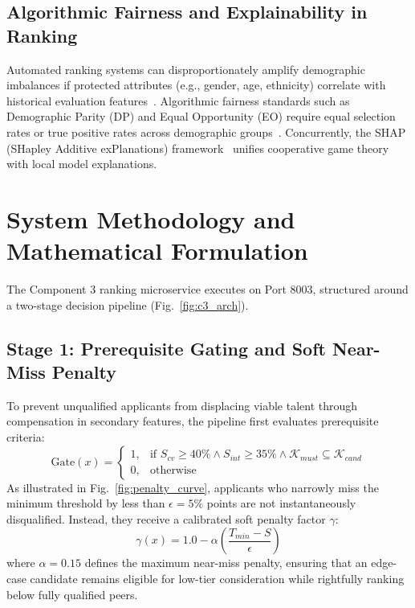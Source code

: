 \documentclass[conference]{IEEEtran}
\begin{document}
\subsection{Algorithmic Fairness and Explainability in Ranking}
Automated ranking systems can disproportionately amplify demographic imbalances if protected attributes (e.g., gender, age, ethnicity) correlate with historical evaluation features~\cite{singh2018fairness}. Algorithmic fairness standards such as Demographic Parity (DP) and Equal Opportunity (EO) require equal selection rates or true positive rates across demographic groups~\cite{hardt2016equality, zehlike2017fair}. Concurrently, the SHAP (SHapley Additive exPlanations) framework~\cite{lundberg2017unified} unifies cooperative game theory with local model explanations.

\section{System Methodology and Mathematical Formulation}
The Component 3 ranking microservice executes on Port 8003, structured around a two-stage decision pipeline (Fig.~\ref{fig:c3_arch}).

\subsection{Stage 1: Prerequisite Gating and Soft Near-Miss Penalty}
To prevent unqualified applicants from displacing viable talent through compensation in secondary features, the pipeline first evaluates prerequisite criteria:
\begin{equation}
\text{Gate}(x) = \begin{cases}
1, & \text{if } S_{cv} \ge 40\% \land S_{int} \ge 35\% \land \mathcal{K}_{must} \subseteq \mathcal{K}_{cand} \\
0, & \text{otherwise}
\end{cases}
\end{equation}
As illustrated in Fig.~\ref{fig:penalty_curve}, applicants who narrowly miss the minimum threshold by less than $\epsilon = 5\%$ points are not instantaneously disqualified. Instead, they receive a calibrated soft penalty factor $\gamma$:
\begin{equation}
\gamma(x) = 1.0 - \alpha \left(\frac{T_{min} - S}{\epsilon}\right)
\end{equation}
where $\alpha = 0.15$ defines the maximum near-miss penalty, ensuring that an edge-case candidate remains eligible for low-tier consideration while rightfully ranking below fully qualified peers.
\end{document}
